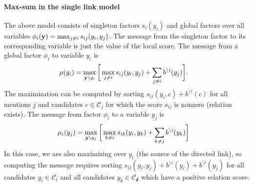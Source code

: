 \paragraph{Max-sum in the single link model}
The above model consists of singleton factors $s_i(y_i)$ and global factors over all variables $\phi_i({\bf y}) = \max_{j \neq i} s_{ij}(y_i, y_j)$.  The message from the singleton factor to its corresponding variable is just the value of the local score. The message from a global factor $\phi_i$ to variable $y_i$ is
\begin{align}
\mu(y_i) &= \max_{{\bf y} \setminus y_i} \bigg[ \max_{j \neq i} s_{ij}(y_i, y_j) + \sum_{j \neq i} b^{\setminus i}(y_j)\bigg].
\end{align}
The maximization can be computed by sorting $s_{ij}(y_i, c) + b^{\setminus i}(c)$ for all mentions $j$ and candidates $c \in \mathcal{C}_j$ for which the score $s_{ij}$ is nonzero (relation exists). The message from factor $\phi_i$ to a variable $y_j$ is
\begin{align}
\mu_i(y_j) &= \max_{{\bf y} \setminus y_j} \bigg[ \max_{k \neq i} s_{ik}(y_i, y_k) + \sum_{k \neq j} b^{\setminus i}(y_k) \bigg]
\end{align}
In this case, we are also maximizing over $y_i$ (the source of the directed link), so computing the message requires sorting $s_{ij}(y_i, y_j) + b^{\setminus i}(y_i) + b^{\setminus i}(y_j)$ for all candidates $y_i \in \mathcal{C}_i$ and all candidates $y_k \in \mathcal{C_k}$ which have a positive relation score.
